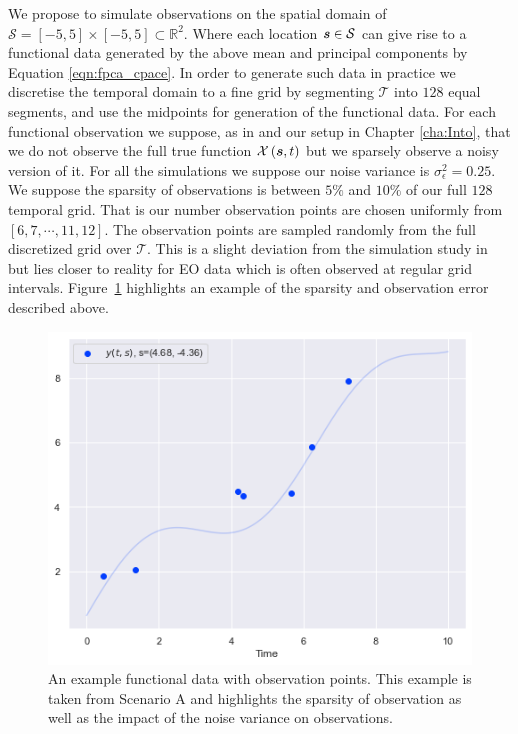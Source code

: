 We propose to simulate observations on the spatial domain of $\mathcal{S} = \left[-5, 5\right] \times \left[-5, 5\right] \subset \mathbb{R}^2$.
Where each location $\bm{{s}} \in \mathcal{S}$ can give rise to a functional data generated by the above mean and principal components by Equation \eqref{eqn:fpca_cpace}.
In order to generate such data in practice we discretise the temporal domain to a fine grid by segmenting $\mathcal{T}$ into $128$ equal segments, and use the midpoints for generation of the functional data.
For each functional observation we suppose, as in \citep{yao_functional_2005} and our setup in Chapter \ref{cha:Into}, that we do not observe the full true function $\mathcal{X}\left(\bm{{s}}, t\right)$ but we sparsely observe a noisy version of it.
For all the simulations we suppose our noise variance is $\sigma^2_\epsilon = 0.25$. 
We suppose the sparsity of observations is between $5\%$ and $10\%$ of our full $128$ temporal grid.
That is our number observation points are chosen uniformly from $\left[6, 7, \cdots, 11, 12\right]$.
The observation points are sampled randomly from the full discretized grid over $\mathcal{T}$.
This is a slight deviation from the simulation study in \citep{yao_functional_2005} but lies closer to reality for EO data which is often observed at regular grid intervals.
Figure~\ref{fig:sim_example} highlights an example of the sparsity and observation error described above.

\begin{figure}
	\centering
	\includegraphics[width=\textwidth]{sim_ex}
	\caption{An example functional data with observation points. This example is taken from Scenario A and highlights the sparsity of observation as well as the impact of the noise variance on observations.}
	\label{fig:sim_example}
\end{figure}

